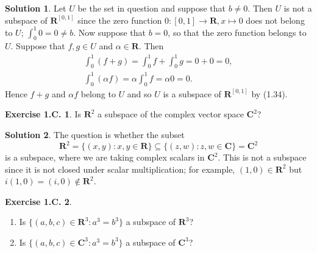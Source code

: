 \documentclass[12pt]{article}
\theoremstyle{definition}
\theoremstyle{exercise}
\newtheorem{exercise}{Exercise 1.C.}
\theoremstyle{solution}
\newtheorem*{solution}{Solution}
\newcommand{\R}{\mathbf{R}}
\newcommand{\C}{\mathbf{C}}
\begin{document}
\begin{solution}
    Let \( U \) be the set in question and suppose that \( b \neq 0 \). Then \( U \) is not a subspace of \( \R^{[0, 1]} \) since the zero function \( 0 : [0, 1] \to \R, x \mapsto 0 \) does not belong to \( U \); \( \int_0^1 0 = 0 \neq b \). Now suppose that \( b = 0 \), so that the zero function belongs to \( U \). Suppose that \( f, g \in U \) and \( \alpha \in \R \). Then
    \begin{gather*}
        \int_0^1 (f + g) = \int_0^1 f + \int_0^1 g = 0 + 0 = 0, \\[2mm]
        \int_0^1 (\alpha f) = \alpha \int_0^1 f = \alpha 0 = 0.
    \end{gather*}
    Hence \( f + g \) and \( \alpha f \) belong to \( U \) and so \( U \) is a subspace of \( \R^{[0, 1]} \) by (1.34).
\end{solution}

\begin{exercise}
\label{ex:5}
    Is \( \R^2 \) a subspace of the complex vector space \( \C^2 \)?
\end{exercise}

\begin{solution}
    The question is whether the subset
    \[
        \R^2 = \{ (x, y) : x, y \in \R \} \subseteq \{ (z, w) : z, w \in \C \} = \C^2
    \]
    is a subspace, where we are taking complex scalars in \( \C^2 \). This is not a subspace since it is not closed under scalar multiplication; for example, \( (1, 0) \in \R^2 \) but \( i (1, 0) = (i, 0) \not\in \R^2 \).
\end{solution}

\begin{exercise}
\label{ex:6}
    \begin{enumerate}
        \item Is \( \{ (a, b, c) \in \R^3 : a^3 = b^3 \} \) a subspace of \( \R^3 \)?

        \item Is \( \{ (a, b, c) \in \C^3 : a^3 = b^3 \} \) a subspace of \( \C^3 \)?
    \end{enumerate}
\end{exercise}
\end{document}
